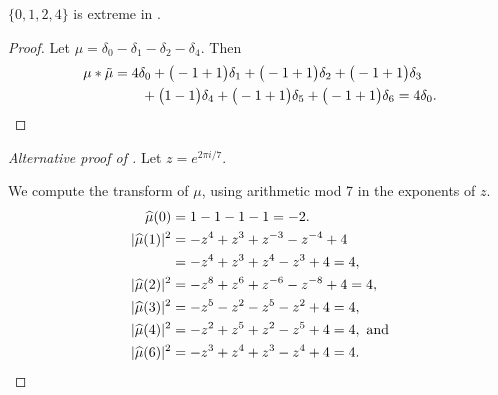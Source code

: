 \begin{prop}
\cite{MR627683}
\label{prop4in7}
$\{0, 1, 2, 4\}$ is extreme in .
\end{prop}

\begin{proof}
Let $\mu = \delta_{0} - \delta_{1} - \delta_{2} - \delta_{4} 
$.  Then 
\begin{align*} 
\mu * \tilde \mu & = 4\delta_{0}   +  \big(  -1 + 1\big)\delta_{1} 
 +  \big(  -1 + 1\big)\delta_{2}  +  \big(  -1 + 1\big)\delta_{3} 
 \\&\qquad 
  +  \big(1-1\big)\delta_{4}   +  \big(  -1 + 1\big)\delta_{5} 
   +  \big(  -1 + 1\big)\delta_{6} 
=4\delta_0.\qedhere
\end{align*}
\end{proof}


\begin{proof}[Alternative proof of ]
Let $z =e^{2\pi i/7}$.

We compute the transform of $\mu$, using arithmetic mod 7 in
the exponents of $z$.
\begin{align*}
\widehat\mu(0) &= 1 -1-1-1=-2.\\
|\widehat\mu(1)|^2 &= -z^4 + z^3 + z^{-3} - z^{-4} + 4
\\ \notag
&= -z^4+z^3+z^4-z^3+4=4,
\\
|\widehat\mu(2)|^2 &=
-z^8 + z^6 + z^{-6} - z^{-8} + 4=4,%
\\
|\widehat\mu(3)|^2 &=
-z^5-z^2-z^5-z^2+4=4,
\\
|\widehat\mu(4)|^2 &=
%
-z^2+z^5+z^2-z^5+4=4,%
\text{ and}
\\
|\widehat\mu(6)|^2 &= 
-z^3+z^4+z^3-z^4+4=4.
\qedhere
\end{align*}
\end{proof}


